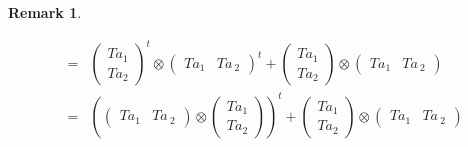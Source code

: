 \documentclass[aps,preprint]{revtex4}
\newtheorem{remark}[theorem]{Remark}
\begin{document}
\begin{remark}
\begin{enumerate}
\begin{eqnarray}
&=&\left( 
\begin{array}{c}
Ta_{1} \\ 
Ta_{2}%
\end{array}%
\right) ^{t}\otimes \left( 
\begin{array}{cc}
Ta_{1} & Ta_{\ 2}%
\end{array}%
\right) ^{t}+\left( 
\begin{array}{c}
Ta_{1} \\ 
Ta_{2}%
\end{array}%
\right) \otimes \left( 
\begin{array}{cc}
Ta_{1} & Ta_{\ 2}%
\end{array}%
\right) \\
&=&\left( \left( 
\begin{array}{cc}
Ta_{1} & Ta_{\ 2}%
\end{array}%
\right) \otimes \left( 
\begin{array}{c}
Ta_{1} \\ 
Ta_{2}%
\end{array}%
\right) \right) ^{t}+\left( 
\begin{array}{c}
Ta_{1} \\ 
Ta_{2}%
\end{array}%
\right) \otimes \left( 
\begin{array}{cc}
Ta_{1} & Ta_{\ 2}%
\end{array}%
\right)
\end{eqnarray}


\end{enumerate}
\end{remark}
\end{document}
